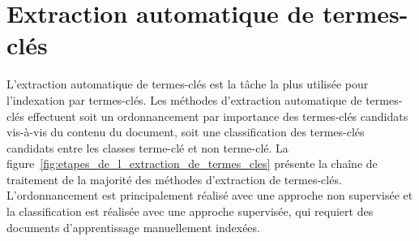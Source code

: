 
  \section{Extraction automatique de termes-clés}
  \label{sec:main-state_of_the_art-automatic_keyphrase_extraction}
    L'extraction automatique de termes-clés est la tâche la plus utilisée pour
    l'indexation par termes-clés. Les méthodes d'extraction automatique de
    termes-clés effectuent soit un ordonnancement par importance des termes-clés
    candidats vis-à-vis du contenu du document, soit une classification des
    termes-clés candidats entre les classes \og{}terme-clé\fg{} et \og{}non
    terme-clé\fg{}. La figure~\ref{fig:etapes_de_l_extraction_de_termes_cles}
    présente la chaîne de traitement de la majorité des méthodes d'extraction de
    termes-clés. L'ordonnancement est principalement réalisé avec une
    approche non supervisée et la classification est réalisée avec une approche
    supervisée, qui requiert des documents d'apprentissage manuellement indexées.
